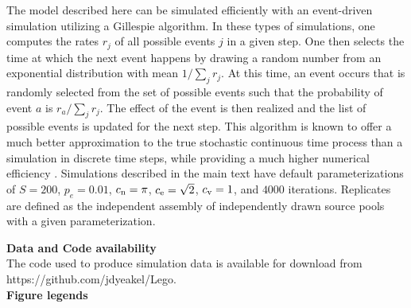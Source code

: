 \documentclass[twocolumn,preprintnumbers,amsmath,amssymb,superscriptaddress,linenumbers]{revtex4-1}
\begin{document}
{  The model described here can be simulated efficiently with an event-driven simulation utilizing a Gillespie algorithm.
  In these types of simulations, one computes the rates $r_j$ of all possible events $j$ in a given step.
  One then selects the time at which the next event happens by drawing a random number from an exponential distribution with mean $1/\sum_j{r_j}$.
  At this time, an event occurs that is randomly selected from the set of possible events such that the probability of event $a$ is $r_a/\sum_j{r_j}$.
  The effect of the event is then realized and the list of possible events is updated for the next step.
  This algorithm is known to offer a much better approximation to the true stochastic continuous time process than a simulation in discrete time steps, while providing a much higher numerical efficiency \cite{Gillespie1977}.
  Simulations described in the main text have default parameterizations of $S=200$, $p_e=0.01$, $c_{\rm n} = \pi$, $c_{\rm e} = \sqrt{2}$, $c_{\rm v} = 1$, and $4000$ iterations.
  Replicates are defined as the independent assembly of independently drawn source pools with a given parameterization.}

\vspace{2mm}
\noindent \textbf{Data and Code availability}\\
  \footnotesize{
  The code used to produce simulation data is available for download from https://github.com/jdyeakel/Lego.
  }\\

\clearpage
\onecolumngrid
\noindent \textbf{Figure legends}\\
  
\end{document}
